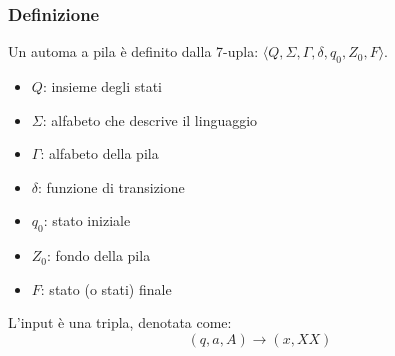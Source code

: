 \documentclass[11pt]{article}
\begin{document}
\subsubsection{Definizione}
Un automa a pila è definito dalla 7-upla: $\langle Q,\Sigma,\Gamma,\delta,q_0,Z_0,F \rangle$.
\begin{itemize}
    \item $Q$: insieme degli stati
    \item $\Sigma$: alfabeto che descrive il linguaggio
    \item $\Gamma$: alfabeto della pila 
    \item $\delta$: funzione di transizione
    \item $q_0$: stato iniziale 
    \item $Z_0$: fondo della pila 
    \item $F$: stato (o stati) finale
\end{itemize}
L'input è una tripla, denotata come:
\begin{equation*}
    (q,a,A)\rightarrow(x,XX)
\end{equation*}
\end{document}
